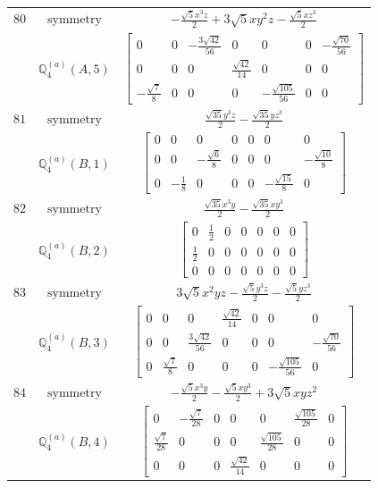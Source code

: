 \documentclass[fleqn,8pt,landscape]{jsarticle}
\begin{document}
\begin{longtable}{ccc}
$ 80 $ & $ \text{symmetry} $ & $ - \frac{\sqrt{5} x^{3} z}{2} + 3 \sqrt{5} x y^{2} z - \frac{\sqrt{5} x z^{3}}{2} $ \\
$  $ & $ \mathbb{Q}_{4}^{(a)}(A,5) $ & $ \begin{bmatrix} 0 & 0 & - \frac{3 \sqrt{42}}{56} & 0 & 0 & 0 & - \frac{\sqrt{70}}{56} \\ 0 & 0 & 0 & \frac{\sqrt{42}}{14} & 0 & 0 & 0 \\ - \frac{\sqrt{7}}{8} & 0 & 0 & 0 & - \frac{\sqrt{105}}{56} & 0 & 0 \end{bmatrix} $ \\ \hline
$ 81 $ & $ \text{symmetry} $ & $ \frac{\sqrt{35} y^{3} z}{2} - \frac{\sqrt{35} y z^{3}}{2} $ \\
$  $ & $ \mathbb{Q}_{4}^{(a)}(B,1) $ & $ \begin{bmatrix} 0 & 0 & 0 & 0 & 0 & 0 & 0 \\ 0 & 0 & - \frac{\sqrt{6}}{8} & 0 & 0 & 0 & - \frac{\sqrt{10}}{8} \\ 0 & - \frac{1}{8} & 0 & 0 & 0 & - \frac{\sqrt{15}}{8} & 0 \end{bmatrix} $ \\ \hline
$ 82 $ & $ \text{symmetry} $ & $ \frac{\sqrt{35} x^{3} y}{2} - \frac{\sqrt{35} x y^{3}}{2} $ \\
$  $ & $ \mathbb{Q}_{4}^{(a)}(B,2) $ & $ \begin{bmatrix} 0 & \frac{1}{2} & 0 & 0 & 0 & 0 & 0 \\ \frac{1}{2} & 0 & 0 & 0 & 0 & 0 & 0 \\ 0 & 0 & 0 & 0 & 0 & 0 & 0 \end{bmatrix} $ \\ \hline
$ 83 $ & $ \text{symmetry} $ & $ 3 \sqrt{5} x^{2} y z - \frac{\sqrt{5} y^{3} z}{2} - \frac{\sqrt{5} y z^{3}}{2} $ \\
$  $ & $ \mathbb{Q}_{4}^{(a)}(B,3) $ & $ \begin{bmatrix} 0 & 0 & 0 & \frac{\sqrt{42}}{14} & 0 & 0 & 0 \\ 0 & 0 & \frac{3 \sqrt{42}}{56} & 0 & 0 & 0 & - \frac{\sqrt{70}}{56} \\ 0 & \frac{\sqrt{7}}{8} & 0 & 0 & 0 & - \frac{\sqrt{105}}{56} & 0 \end{bmatrix} $ \\ \hline
$ 84 $ & $ \text{symmetry} $ & $ - \frac{\sqrt{5} x^{3} y}{2} - \frac{\sqrt{5} x y^{3}}{2} + 3 \sqrt{5} x y z^{2} $ \\
$  $ & $ \mathbb{Q}_{4}^{(a)}(B,4) $ & $ \begin{bmatrix} 0 & - \frac{\sqrt{7}}{28} & 0 & 0 & 0 & \frac{\sqrt{105}}{28} & 0 \\ \frac{\sqrt{7}}{28} & 0 & 0 & 0 & \frac{\sqrt{105}}{28} & 0 & 0 \\ 0 & 0 & 0 & \frac{\sqrt{42}}{14} & 0 & 0 & 0 \end{bmatrix} $ \\ \hline

\end{longtable}
\end{document}
